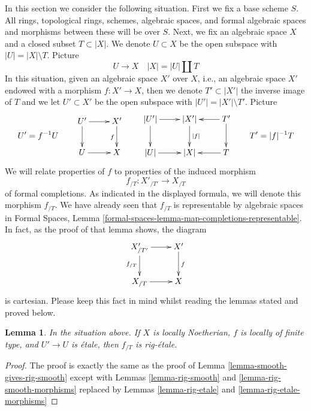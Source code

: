 \documentclass[10pt,a4paper]{amsart}
\theoremstyle{plain}
\newtheorem{lemma}[subsection]{Lemma}
\theoremstyle{definition}
\theoremstyle{remark}
\numberwithin{equation}{subsection}
\begin{document}
\noindent
In this section we consider the following situation.
First we fix a base scheme $S$. All rings, topological rings,
schemes, algebraic spaces, and formal algebraic spaces and
morphisms between these will be over $S$. Next, we fix an
algebraic space $X$ and a closed subset $T \subset |X|$.
We denote $U \subset X$ be the open subspace with $|U| = |X| \setminus T$.
Picture
$$
U \to X \quad |X| = |U| \amalg T
$$
In this situation, given an algebraic space $X'$ over $X$, i.e., an
algebraic space $X'$ endowed with a morphism $f : X' \to X$, then we
denote $T' \subset |X'|$ the inverse image of $T$ and we let $U' \subset X'$
be the open subspace with $|U'| = |X'| \setminus T'$. Picture
$$
U' = f^{-1}U
\quad\quad
\vcenter{
\xymatrix{
U' \ar[d] \ar[r] & X' \ar[d]_f \\
U \ar[r] & X
}
}
\quad\quad
\vcenter{
\xymatrix{
|U'| \ar[r] \ar[d] & |X'| \ar[d]^{|f|} & T' \ar[l] \ar[d] \\
|U| \ar[r] & |X| & T \ar[l]
}
}
\quad\quad
T' = |f|^{-1}T
$$
We will relate properties of $f$ to properties of the induced morphism
$$
f_{/T} : X'_{/T'} \longrightarrow X_{/T}
$$
of formal completions. As indicated in the displayed formula, we will
denote this morphism $f_{/T}$. We have already seen that
$f_{/T}$ is representable by algebraic spaces in
Formal Spaces, Lemma
\ref{formal-spaces-lemma-map-completions-representable}.
In fact, as the proof of that lemma shows, the diagram
$$
\xymatrix{
X'_{/T'} \ar[d]_{f_{/T}} \ar[r] & X' \ar[d]^f \\
X_{/T} \ar[r] & X
}
$$
is cartesian. Please keep this fact in mind whilst reading the lemmas stated
and proved below.

\begin{lemma}
\label{lemma-etale-gives-rig-etale}
In the situation above. If $X$ is locally Noetherian,
$f$ is locally of finite type, and $U' \to U$ is \'etale, then
$f_{/T}$ is rig-\'etale.
\end{lemma}

\begin{proof}
The proof is exactly the same as the proof of
Lemma \ref{lemma-smooth-gives-rig-smooth} except with
Lemmas \ref{lemma-rig-smooth} and \ref{lemma-rig-smooth-morphisms}
replaced by
Lemmas \ref{lemma-rig-etale} and \ref{lemma-rig-etale-morphisms}
\end{proof}
\end{document}
